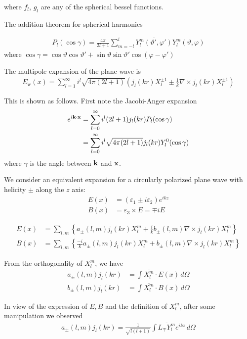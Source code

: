 where $f_l$, $g_l$ are any of the spherical bessel functions.

The addition theorem for spherical harmonics

\begin{align}
  P_l(\cos\gamma) = \frac{4\pi}{2l+1}\sum_{m=-l}^l \overline{Y_l^m(\vartheta',\varphi')}Y_l^m(\vartheta, \varphi)
\end{align}
where $\cos\gamma=\cos\vartheta\cos\vartheta' + \sin\vartheta\sin\vartheta'\cos(\varphi-\varphi')$

The multipole expansion of the plane wave is
\begin{align}
  E_\text{w}(x) = \sum_{l=1}^\infty i^l\sqrt{4\pi(2l+1)}\left(j_l(kr)X_l^{\pm 1}\pm
                  \frac{1}{k}\nabla\times j_l(kr)X_l^{\pm 1}\right)
\end{align}

This is shown as follows. First note the Jacobi-Anger expansion
\begin{align}
  e^{i\bf{k}\cdot\bf{x}} &= \sum_{l=0}^{\infty}i^l(2l+1)j_l(kr)P_l(\cos\gamma) \\
              &= \sum_{l=0}^{\infty}i^l\sqrt{4\pi(2l+1)}j_l(kr)Y_l^0(\cos\gamma)
\end{align}
where $\gamma$ is the angle between $\bf{k}$ and $\bf{x}$.

We consider an equivalent expansion for a circularly polarized plane wave with helicity $\pm$ along the $z$ axis:
\begin{align}
  E(x) &= (\varepsilon_1\pm i\varepsilon_2)e^{ikz} \\
  B(x) &= \varepsilon_3\times E = \mp iE
\end{align}

\begin{align}
  E(x)&=\sum_{l,m}\left\{a_\pm(l, m)j_l(kr)X_l^m + \frac{i}{k} b_\pm(l, m)\nabla\times j_l(kr)X_l^m\right\} \\
  B(x)&=\sum_{l,m}\left\{\frac{-i}{k}a_\pm(l, m)j_l(kr)X_l^m + b_\pm(l, m)\nabla\times j_l(kr)X_l^m\right\}
\end{align}

From the orthogonality of $X_l^m$, we have 
\begin{align}
  a_\pm(l, m)j_l(kr) &= \int \overline{X_l^m}\cdot E(x)\,d\Omega \\
  b_\pm(l, m)j_l(kr) &= \int \overline{X_l^m}\cdot B(x)\,d\Omega
\end{align}

In view of the expression of $E, B$ and the definition of $X_l^m$, after some manipulation we observed 
\begin{align}
  a_\pm(l, m)j_l(kr) = \frac{1}{\sqrt{l(l+1)}}\int\overline{L_{\mp}Y_l^m}e^{ikz}\,d\Omega
\end{align}


